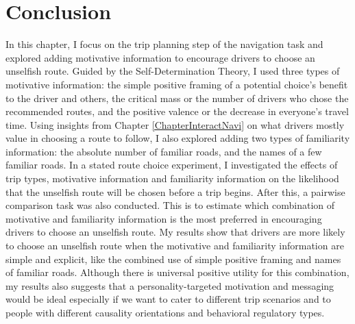 \section{Conclusion}
In this chapter, I focus on the trip planning step of the navigation task and explored adding motivative information to encourage drivers to choose an unselfish route. Guided by the Self-Determination Theory, I used three types of motivative information: the simple positive framing of a potential choice's benefit to the driver and others, the critical mass or the number of drivers who chose the recommended routes, and the positive valence or the decrease in everyone's travel time. Using insights from Chapter \ref{ChapterInteractNavi} on what drivers mostly value in choosing a route to follow, I also explored adding two types of familiarity information: the absolute number of familiar roads, and the names of a few familiar roads. In a stated route choice experiment, I investigated the effects of trip types, motivative information and familiarity information on the likelihood that the unselfish route will be chosen before a trip begins. After this, a pairwise comparison task was also conducted. This is to estimate which combination of motivative and familiarity information is the most preferred in encouraging drivers to choose an unselfish route. My results show that drivers are more likely to choose an unselfish route when the motivative and familiarity information are simple and explicit, like the combined use of simple positive framing and names of familiar roads. Although there is universal positive utility for this combination, my results also suggests that a personality-targeted motivation and messaging would be ideal especially if we want to cater to different trip scenarios and to people with different causality orientations and behavioral regulatory types. 